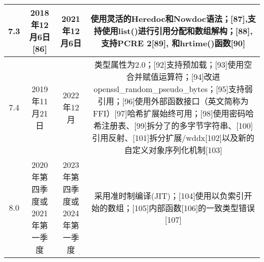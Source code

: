 \begin{table}[ht]
\begin{tabular}{|c|c|c|c}
\hline
7.3 & 2018年12月6日[86] & 2021年12月6日 & 使用灵活的Heredoc和Nowdoc语法；[87],支持使用list()进行引用分配和数组解构；[88],支持PCRE 2[89], 和hrtime()函数[90]\\
\hline
7.4 & 2019年11月21日 & 2022年12月 & 类型属性为2.0；[92]支持预加载；[93]使用空合并赋值运算符；[94]改进openssl_random_pseudo_bytes；[95]支持弱引用；[96]使用外部函数接口（英文简称为FFI）[97]哈希扩展始终可用；[98]使用密码哈希注册表、[99]拆分了的多字节字符串、[100]引用反射、[101]拆分扩展/wddx[102]以及新的自定义对象序列化机制[103]\\
\hline
8.0 & 2020年第四季度或2021年第一季度 & 2023年第四季度或2024年第一季度 & 采用准时制编译(JIT)；[104]使用以负索引开始的数组；[105]内部函数[106]的一致类型错误[107]\\
\hline
\end{tabular}
\end{table}
